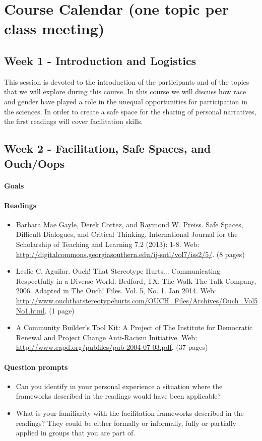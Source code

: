 \documentclass{article}
\begin{document}
\section{Course Calendar (one topic per class meeting)}


\subsection{Week 1 - Introduction and Logistics}
This session is devoted to the introduction of the participants and of the topics that we will explore during this course. In this course we will discuss how race and gender have played a role in the unequal opportunities for participation in the sciences. In order to create a safe space for the sharing of personal narratives, the first readings will cover facilitation skills.

\subsection{Week 2 - Facilitation, Safe Spaces, and Ouch/Oops}
\paragraph{Goals} 
\paragraph{Readings}
\begin{itemize}
\item Barbara Mae Gayle, Derek Cortez, and Raymond W. Preiss. Safe Spaces, Difficult Dialogues, and Critical Thinking. International Journal for the Scholarship of Teaching and Learning 7.2 (2013): 1-8. Web: \url{http://digitalcommons.georgiasouthern.edu/ij-sotl/vol7/iss2/5/}. (8 pages)
\item Leslie C. Aguilar. Ouch! That Stereotype Hurts... Communicating Respectfully in a Diverse World. Bedford, TX: The Walk The Talk Company, 2006. Adapted in The Ouch! Files. Vol. 5, No. 1. Jan 2014. Web: \url{http://www.ouchthatstereotypehurts.com/OUCH_Files/Archives/Ouch_Vol5No1.html}. (1 page)
\item A Community Builder's Tool Kit: A Project of The Institute for Democratic Renewal and Project Change Anti-Racism Initiative. Web: \url{http://www.capd.org/pubfiles/pub-2004-07-03.pdf}. (37 pages)
\end{itemize}
\paragraph{Question prompts}
\begin{itemize}
\item Can you identify in your personal experience a situation where the frameworks described in the readings would have been applicable?
\item What is your familiarity with the facilitation frameworks described in the readings? They could be either formally or informally, fully or partially applied in groups that you are part of.
\end{itemize}
\end{document}
